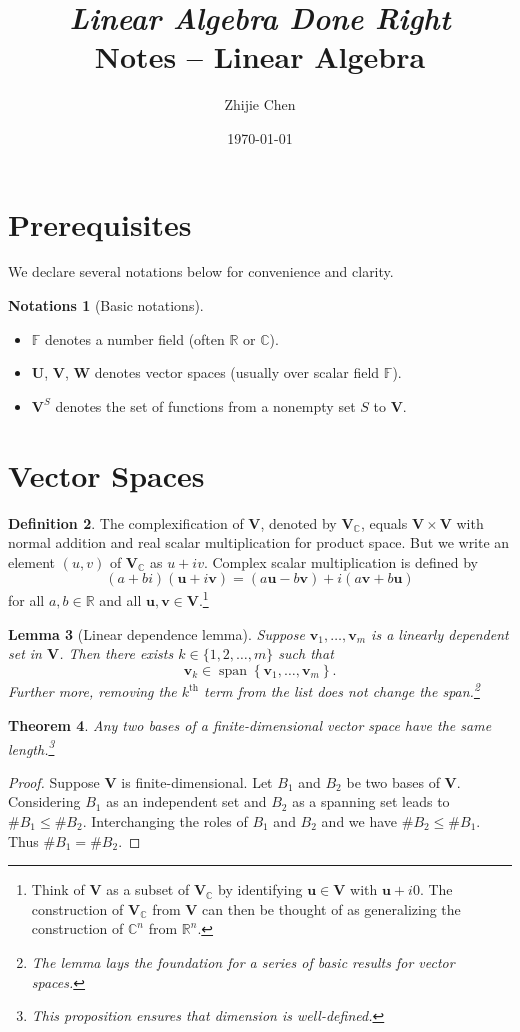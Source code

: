\documentclass{tufte-handout}
\title{	
	\normalfont\normalsize 
	{\itshape Linear Algebra Done Right} \\ [0pt]
	\huge Notes -- Linear Algebra
}
\author{Zhijie Chen}
\date{\vspace{-5pt}\normalsize\today}
\def \v {\vspace{0.2cm}}
\theoremstyle{plain} %
\newtheorem{thm}{Theorem}
\newtheorem{lem}[thm]{Lemma}
\theoremstyle{definition}
\newtheorem{defn}[thm]{Definition}
\newtheorem{notns}[thm]{Notations}
\theoremstyle{remark}
\newcommand{\cbra}[1]{\mathopen{}\left\{#1\right\}}
\newcommand{\R}{\mathbb{R}}
\newcommand{\C}{\mathbb{C}}
\newcommand{\F}{\mathbb{F}}
\newcommand{\U}{\bm{U}}
\newcommand{\V}{\bm{V}}
\newcommand{\W}{\bm{W}}
\renewcommand{\u}{\bm{u}}
\renewcommand{\v}{\bm{v}}
\DeclareMathOperator{\spn}{span}
\begin{document}
\justifying
\maketitle
\tableofcontents
\newpage


\section{Prerequisites}
We declare several notations below for convenience and clarity.
\begin{notns}[Basic notations]
	\phantom{linebreak}

    \begin{itemize}
        \item $\F$ denotes a number field (often $\R$ or $\C$).
        \item $\U$, $\V$, $\W$ denotes vector spaces (usually over scalar field $\F$).
        \item $\V^S$ denotes the set of functions from a nonempty set $S$ to $\V$.
    \end{itemize}
\end{notns}


\section{Vector Spaces}
\begin{defn}
	The complexification of $\V$, denoted by $\V_\C$, equals $\V\times\V$ with normal addition and real scalar multiplication for product space. But we write an element $(u,v)$ of $\V_\C$ as $u+iv$. Complex scalar multiplication is defined by
	\[(a+bi)(\u+i\v)=(a\u-b\v)+i(a\v+b\u)\]
	for all $a,b\in\R$ and all $\u,\v\in\V$.\footnote{Think of $\V$ as a subset of $\V_\C$ by identifying $\u\in\V$ with $\u+i0$. The construction of $\V_\C$ from $\V$ can then be thought of as generalizing the construction of $\C^n$ from $\R^n$.}
\end{defn}

\begin{lem}[Linear dependence lemma]
	Suppose $\v_1,\dots,\v_m$ is a linearly dependent set in $\V$. Then there exists $k\in\{1,2,\dots,m\}$ such that
	\[\v_k\in\spn\cbra{\v_1,\dots,\v_m}.\]
	Further more, removing the $k^\text{th}$ term from the list does not change the span.\footnote{The lemma lays the foundation for a series of basic results for vector spaces.}
\end{lem}

\begin{thm}
	Any two bases of a finite-dimensional vector space have the same length.\footnote{This proposition ensures that \emph{dimension} is well-defined.}
\end{thm}
\begin{proof}
	Suppose $\V$ is finite-dimensional. Let $B_1$ and $B_2$ be two bases of $\V$. Considering $B_1$ as an independent set and $B_2$ as a spanning set leads to $\#B_1\leq\#B_2$. Interchanging the roles of $B_1$ and $B_2$ and we have $\#B_2\leq\#B_1$. Thus $\#B_1=\#B_2$.
\end{proof}
\end{document}
